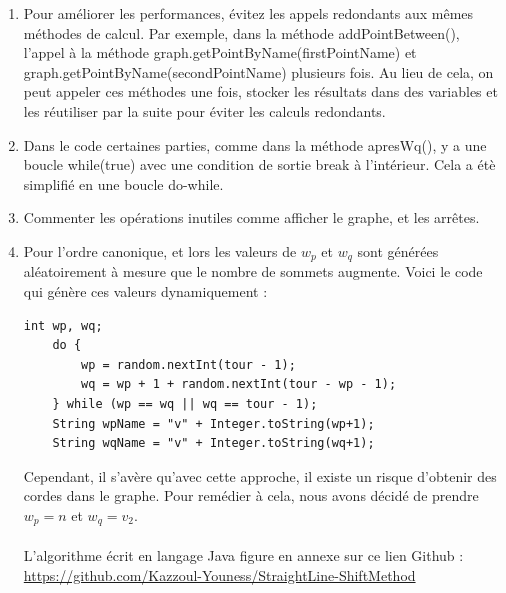 \documentclass[hidelinks,letterpaper,12pt]{article}
\begin{document}
\begin{enumerate}
\item  Pour améliorer les performances, évitez les appels redondants aux mêmes méthodes de calcul. Par exemple, dans la méthode addPointBetween(), l'appel à la méthode graph.getPointByName(firstPointName) et graph.getPointByName(secondPointName) plusieurs fois. Au lieu de cela, on peut appeler ces méthodes une fois, stocker les résultats dans des variables et les réutiliser par la suite pour éviter les calculs redondants.

\item Dans le code certaines parties, comme dans la méthode apresWq(), y a une boucle while(true) avec une condition de sortie break à l'intérieur. Cela a étè simplifié en une boucle do-while.

\item Commenter les opérations inutiles comme afficher le graphe, et les arrêtes.

\item Pour l'ordre canonique, et lors  les valeurs de $w_p$ et $w_q$ sont générées aléatoirement à mesure que le nombre de sommets augmente. Voici le code qui génère ces valeurs dynamiquement :
\begin{lstlisting}[caption={Extrait de code représentant la génération d'un ordre canonique aléatoire.}, label={Extrait de code représentant la génération d'un ordre canonique aléatoire.}]
	int wp, wq;
	do {
		wp = random.nextInt(tour - 1);
		wq = wp + 1 + random.nextInt(tour - wp - 1);
	} while (wp == wq || wq == tour - 1);
	String wpName = "v" + Integer.toString(wp+1);
	String wqName = "v" + Integer.toString(wq+1);
\end{lstlisting}
Cependant, il s'avère qu'avec cette approche, il existe un risque d'obtenir des cordes dans le graphe. Pour remédier à cela, nous avons décidé de prendre $w_p = n$ et $w_q = v_2$.
\\ \\ 
L’algorithme écrit en langage Java figure en annexe sur ce lien Github : \\
\url{https://github.com/Kazzoul-Youness/StraightLine-ShiftMethod}
\end{enumerate}




\end{document}
